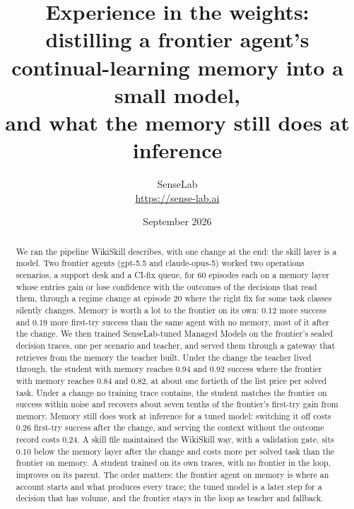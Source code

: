 \documentclass[11pt]{article}
\title{\vspace{-2.2em}\bfseries Experience in the weights:\\[0.2em]
\large distilling a frontier agent's continual-learning memory into a small model,\\
and what the memory still does at inference}
\author{SenseLab\\[0.3em]\normalsize\url{https://sense-lab.ai}}
\date{September 2026}
\begin{document}
\maketitle
\vspace{-1.2em}

\begin{abstract}
\noindent
We ran the pipeline WikiSkill describes, with one change at the end: the skill layer is a
model. Two frontier agents (gpt-5.5 and claude-opus-5) worked two operations scenarios, a
support desk and a CI-fix queue, for 60 episodes each on a memory layer whose entries gain or
lose confidence with the outcomes of the decisions that read them, through a regime change at
episode 20 where the right fix for some task classes silently changes. Memory is worth a lot
to the frontier on its own: 0.12 more success and 0.19 more first-try success than the same
agent with no memory, most of it after the change. We then trained SenseLab-tuned Managed
Models on the frontier's sealed decision traces, one per scenario and teacher, and served them
through a gateway that retrieves from the memory the teacher built. Under the change the
teacher lived through, the student with memory reaches 0.94 and 0.92 success where the
frontier with memory reaches 0.84 and 0.82, at about one fortieth of the list price per solved
task. Under a change no training trace contains, the student matches the frontier on success
within noise and recovers about seven tenths of the frontier's first-try gain from memory.
Memory still does work at inference for a tuned model: switching it off costs 0.26 first-try
success after the change, and serving the context without the outcome record costs 0.24. A
skill file maintained the WikiSkill way, with a validation gate, sits 0.10 below the memory
layer after the change and costs more per solved task than the frontier on memory. A student
trained on its own traces, with no frontier in the loop, improves on its parent. The order
matters: the frontier agent on memory is where an account starts and what produces every
trace; the tuned model is a later step for a decision that has volume, and the frontier stays
in the loop as teacher and fallback.
\end{abstract}
\end{document}
